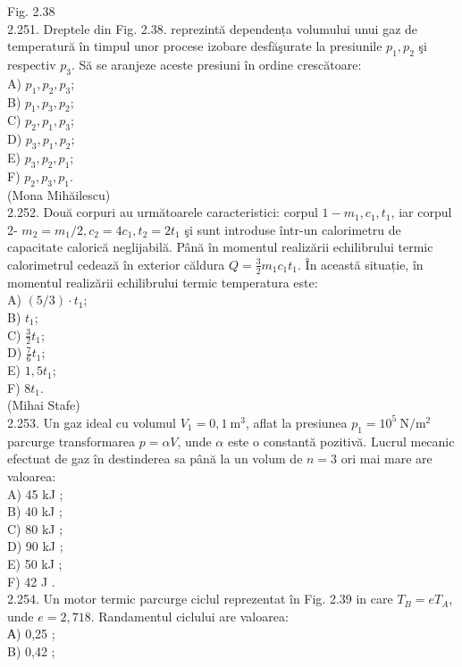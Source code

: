 \documentclass[10pt]{article}
\begin{document}
Fig. 2.38\\
2.251. Dreptele din Fig. 2.38. reprezintă dependența volumului unui gaz de temperatură în timpul unor procese izobare desfăşurate la presiunile $p_{1}, p_{2}$ şi respectiv $p_{3}$. Să se aranjeze aceste presiuni în ordine crescătoare:\\
A) $p_{1}, p_{2}, p_{3}$;\\
B) $p_{1}, p_{3}, p_{2}$;\\
C) $p_{2}, p_{1}, p_{3}$;\\
D) $p_{3}, p_{1}, p_{2}$;\\
E) $p_{3}, p_{2}, p_{1}$;\\
F) $p_{2}, p_{3}, p_{1}$.\\
(Mona Mihăilescu)\\
2.252. Două corpuri au următoarele caracteristici: corpul $1-m_{1}, c_{1}, t_{1}$, iar corpul 2- $m_{2}=m_{1} / 2, c_{2}=4 c_{1}, t_{2}=2 t_{1}$ şi sunt introduse într-un calorimetru de capacitate calorică neglijabilă. Până în momentul realizării echilibrului termic calorimetrul cedează în exterior căldura $Q=\frac{3}{2} m_{1} c_{1} t_{1}$. În această situație, în momentul realizării echilibrului termic temperatura este:\\
A) $(5 / 3) \cdot t_{1}$;\\
B) $t_{1}$;\\
C) $\frac{3}{2} t_{1}$;\\
D) $\frac{7}{6} t_{1}$;\\
E) $1,5 t_{1}$;\\
F) $8 t_{1}$.\\
(Mihai Stafe)\\
2.253. Un gaz ideal cu volumul $V_{1}=0,1 \mathrm{~m}^{3}$, aflat la presiunea $p_{1}=10^{5} \mathrm{~N} / \mathrm{m}^{2}$ parcurge transformarea $p=\alpha V$, unde $\alpha$ este o constantă pozitivă. Lucrul mecanic efectuat de gaz în destinderea sa până la un volum de $n=3$ ori mai mare are valoarea:\\
A) 45 kJ ;\\
B) 40 kJ ;\\
C) 80 kJ ;\\
D) 90 kJ ;\\
E) 50 kJ ;\\
F) 42 J .\\
2.254. Un motor termic parcurge ciclul reprezentat în Fig. 2.39 in care $T_{B}=e T_{A}$, unde $e=2,718$. Randamentul ciclului are valoarea:\\
А) 0,25 ;\\
B) 0,42 ;\\
\end{document}
